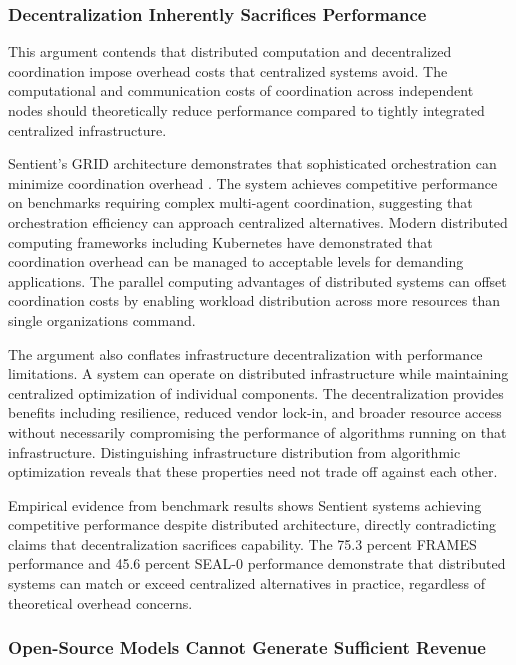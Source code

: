 \subsubsection{Decentralization Inherently Sacrifices Performance}

This argument contends that distributed computation and decentralized coordination impose overhead costs that centralized systems avoid. The computational and communication costs of coordination across independent nodes should theoretically reduce performance compared to tightly integrated centralized infrastructure.

Sentient's GRID architecture demonstrates that sophisticated orchestration can minimize coordination overhead \cite{ods_github2025}. The system achieves competitive performance on benchmarks requiring complex multi-agent coordination, suggesting that orchestration efficiency can approach centralized alternatives. Modern distributed computing frameworks including Kubernetes have demonstrated that coordination overhead can be managed to acceptable levels for demanding applications. The parallel computing advantages of distributed systems can offset coordination costs by enabling workload distribution across more resources than single organizations command.

The argument also conflates infrastructure decentralization with performance limitations. A system can operate on distributed infrastructure while maintaining centralized optimization of individual components. The decentralization provides benefits including resilience, reduced vendor lock-in, and broader resource access without necessarily compromising the performance of algorithms running on that infrastructure. Distinguishing infrastructure distribution from algorithmic optimization reveals that these properties need not trade off against each other.

Empirical evidence from benchmark results shows Sentient systems achieving competitive performance despite distributed architecture, directly contradicting claims that decentralization sacrifices capability. The 75.3 percent FRAMES performance and 45.6 percent SEAL-0 performance demonstrate that distributed systems can match or exceed centralized alternatives in practice, regardless of theoretical overhead concerns.

\subsubsection{Open-Source Models Cannot Generate Sufficient Revenue}

